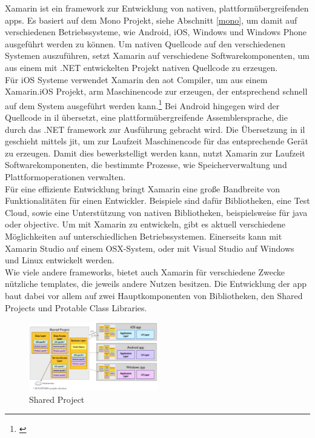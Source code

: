 Xamarin ist ein \gls{framework} zur Entwicklung von nativen, plattformübergreifenden \glspl{app}. Es basiert auf dem Mono Projekt, siehe Abschnitt \eqref{mono}, um damit auf verschiedenen Betriebssysteme, wie Android, iOS, Windows und Windows Phone ausgeführt werden zu können. Um nativen Quellcode auf den verschiedenen Systemen auszuführen, setzt Xamarin auf verschiedene Softwarekomponenten, um aus einem mit .NET entwickelten Projekt nativen Quellcode zu erzeugen.\\
Für iOS Systeme verwendet Xamarin den \gls{aot} Compiler, um aus einem Xamarin.iOS Projekt, \gls{arm} Maschinencode zur erzeugen, der entsprechend schnell auf dem System ausgeführt werden kann.\footnote{\citep[vgl.][Introduction to Mobile Development - Xamarin]{Xamarin.Introductionto}\label{note38}} Bei Android hingegen wird der Quellcode in \gls{il} übersetzt, eine plattformübergreifende Assemblersprache, die durch das .NET \gls{framework} zur Ausführung gebracht wird. Die Übersetzung in \gls{il} geschieht mittels \gls{jit}, um zur Laufzeit Maschinencode für das entsprechende Gerät zu erzeugen. Damit dies bewerkstelligt werden kann, nutzt Xamarin zur Laufzeit Softwarekomponenten, die bestimmte Prozesse, wie Speicherverwaltung und Plattformoperationen verwalten.\\
Für eine effiziente Entwicklung bringt Xamarin eine große Bandbreite von Funktionalitäten für einen Entwickler. Beispiele sind dafür Bibliotheken, eine Test Cloud, sowie eine Unterstützung von nativen Bibliotheken, beispielsweise für \gls{java} oder \gls{objectivc}. Um mit Xamarin zu entwickeln, gibt es aktuell verschiedene Möglichkeiten auf unterschiedlichen Betriebssystemen. Einerseits kann mit Xamarin Studio auf einem OSX-System, oder mit Visual Studio auf Windows und Linux entwickelt werden.\\
Wie viele andere \glspl{framework}, bietet auch Xamarin für verschiedene Zwecke nützliche \glspl{template}, die jeweils andere Nutzen besitzen. Die Entwicklung der \gls{app} baut dabei vor allem auf zwei Hauptkomponenten von Bibliotheken, den Shared Projects und Protable Class Libraries.

\newpage
\begin{figure}
	\begin{center}
		\includegraphics[width=0.5\textwidth]{images/technische_grundlagen/SharedAssetProject.png}
	\end{center}
	\caption{Shared Project \cite{Xamarin.SharedProjects}}
	\label{fig:shared}
\end{figure}

